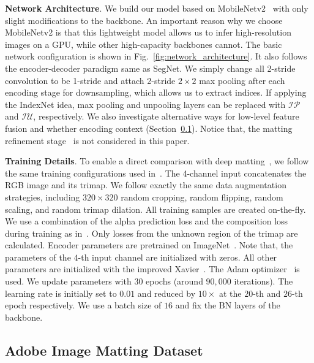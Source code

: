 \documentclass[10pt,twocolumn,letterpaper]{article}
\begin{document}
\vspace{3pt}
\noindent\textbf{Network Architecture}. We build our model based on MobileNetv2~\cite{sandler2018mobilenetv2} with only slight modifications to the backbone. An important reason why we choose MobileNetv2 is that this lightweight model allows us to infer high-resolution images on a GPU, while other high-capacity backbones cannot. The basic network configuration is shown in Fig.~\ref{fig:network_architecture}. It also follows the encoder-decoder paradigm same as SegNet. We simply change all 2-stride convolution to be 1-stride and attach 2-stride $2\times2$ max pooling after each encoding stage for downsampling, which allows us to extract indices. If applying the IndexNet idea, max pooling and unpooling layers can be replaced with $\mathcal{IP}$ and $\mathcal{IU}$, respectively. We also investigate alternative ways for low-level feature fusion and whether encoding context (Section~\ref{subsec:ablation_study}). Notice that, the matting refinement stage~\cite{xu2017deep} is not considered in this paper.

\vspace{3pt}
\noindent\textbf{Training Details}. To enable a direct comparison with deep matting~\cite{xu2017deep}, we follow the same training configurations used in~\cite{xu2017deep}. The 4-channel input concatenates the RGB image and its trimap. We follow exactly the same data augmentation strategies, including $320\times320$ random cropping, random flipping, random scaling, and random trimap dilation. All training samples are created on-the-fly. We use a combination of the alpha prediction loss and the composition loss during training as in~\cite{xu2017deep}. Only losses from the unknown region of the trimap are calculated. Encoder parameters are pretrained on ImageNet~\cite{deng2009imagenet}. Note that, the parameters of the $4$-th input channel are initialized with zeros. All other parameters are initialized with the improved Xavier~\cite{he2015delving}. The Adam optimizer~\cite{kingma2015adam} is used. We update parameters with $30$ epochs (around $90,000$ iterations). The learning rate is initially set to $0.01$ and reduced by $10\times$ at the $20$-th and $26$-th epoch respectively. We use a batch size of $16$ and fix the BN layers of the backbone.

\subsection{Adobe Image Matting Dataset}
\label{subsec:ablation_study}
\end{document}
